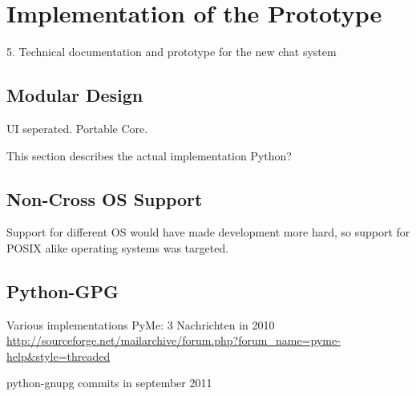 \chapter{Implementation of the Prototype}

5. Technical documentation and prototype for the new chat system


\section{Modular Design}
UI seperated.
Portable Core.

This section describes the actual implementation
Python?
\section{Non-Cross OS Support}
Support for different OS would have made development more
hard, so support for POSIX alike operating systems was targeted.

\section{Python-GPG}
Various implementations \cite{python-gpg}
PyMe: 3 Nachrichten in 2010
\url{http://sourceforge.net/mailarchive/forum.php?forum_name=pyme-help&style=threaded}

python-gnupg commits in september 2011 \cite{python-gnupg}
